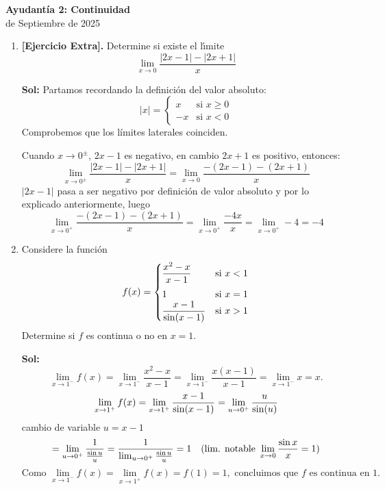 \documentclass[letterpaper,12pt]{article}
\theoremstyle{plain}
\theoremstyle{definition}
\newcommand{\1}{\mathbbm{1}}
\begin{document}
\vspace{-0.2cm}
\begin{center}
\LARGE\textbf{Ayudantía 2: Continuidad}\\
\large {\fontsize{13}{14} de Septiembre de 2025}
\end{center}
\vspace{-0.2cm}
\begin{enumerate}[label=\textbf{P\arabic*.}, itemsep=0cm]
\item \textbf{[Ejercicio Extra].} Determine si existe el l\'{\i}mite
$$ \lim_{x \to 0} \frac{|2x - 1| - |2x + 1|}{x} $$

\color{blue}
\textbf{Sol:} Partamos recordando la definición del valor absoluto:
\[
|x| =
\begin{cases}
x & \text{si } x \geq 0 \\
-x & \text{si } x < 0
\end{cases}
\]
Comprobemos que los límites laterales coinciden.

Cuando \(x \to 0^\pm\), \(2x - 1\) es negativo, en cambio \(2x + 1\) es positivo, entonces:
\[
\lim_{x \to 0^\pm} \frac{|2x - 1| - |2x + 1|}{x}
= \lim_{x \to 0} \frac{-(2x - 1) - (2x + 1)}{x}
\]
\(|2x - 1|\) pasa a ser negativo por definición de valor absoluto y por lo explicado anteriormente, luego
\[
\lim_{x \to 0^+} \frac{-(2x - 1) - (2x + 1)}{x}
= \lim_{x \to 0^+} \frac{-4x}{x}
= \lim_{x \to 0^+} -4 = -4
\]
\color{black}

\item 
Considere la función
\[
f(x) = \begin{cases}
\vspace{0.15cm}
\dfrac{x^2 - x}{x - 1} & \text{si } x < 1 \\
1 & \text{si } x = 1 \\
\dfrac{x - 1}{\sin(x - 1)} & \text{si } x > 1
\end{cases}
\]
Determine si $f$  es continua o no en $x = 1.$ 

\color{blue}
\textbf{Sol:}
\[
\lim_{x \to 1^-} f(x) = \lim_{x \to 1^-} \frac{x^2 - x}{x - 1} = \lim_{x \to 1^-} \frac{x(x-1)}{x-1} = \lim_{x \to 1^-} x = x.
\]
\[
\lim_{x \to 1^+} f(x) = \lim_{x \to 1^+} \frac{x-1}{\sin(x-1)} \\
= \lim_{u \to 0^+} \frac{u}{\sin(u)} 
\]
cambio de variable $u = x-1$
\[
= \lim_{u \to 0^+} \frac{1}{\frac{\sin u}{u}} \\
= \frac{1}{\lim_{u \to 0^+} \frac{\sin u}{u}} = 1 \quad (\text{lim. notable } \lim_{x \to 0} \frac{\sin x}{x} = 1)
\]
$$\text{Como } \lim_{x \to 1^-} f(x) = \lim_{x \to 1^+} f(x) = f(1) = 1, \text{ concluimos que } f \text{ es continua en } 1.$$
\color{black}



\end{enumerate}
\end{document}
